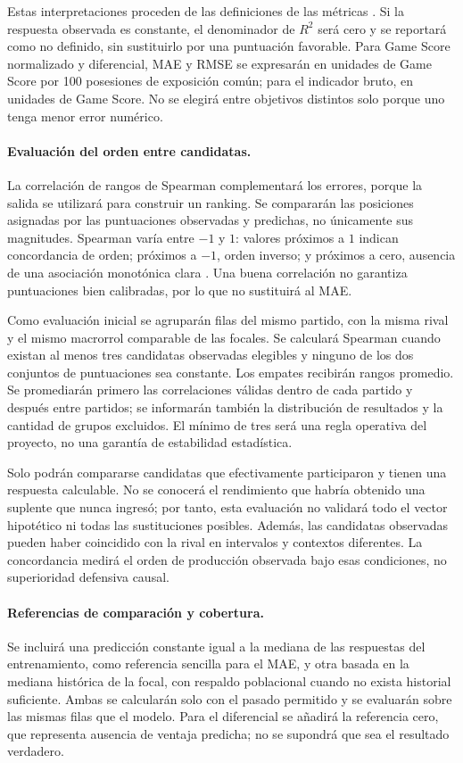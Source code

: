 Estas interpretaciones proceden de las definiciones de las métricas \cite{sklearnMetricas6161}. Si la respuesta observada es constante, el denominador de $R^2$ será cero y se reportará como no definido, sin sustituirlo por una puntuación favorable. Para Game Score normalizado y diferencial, MAE y RMSE se expresarán en unidades de Game Score por 100 posesiones de exposición común; para el indicador bruto, en unidades de Game Score. No se elegirá entre objetivos distintos solo porque uno tenga menor error numérico.

\paragraph*{Evaluación del orden entre candidatas.}
La correlación de rangos de Spearman complementará los errores, porque la salida se utilizará para construir un ranking. Se compararán las posiciones asignadas por las puntuaciones observadas y predichas, no únicamente sus magnitudes. Spearman varía entre $-1$ y $1$: valores próximos a $1$ indican concordancia de orden; próximos a $-1$, orden inverso; y próximos a cero, ausencia de una asociación monotónica clara \cite{scipySpearman6161}. Una buena correlación no garantiza puntuaciones bien calibradas, por lo que no sustituirá al MAE.

Como evaluación inicial se agruparán filas del mismo partido, con la misma rival y el mismo macrorrol comparable de las focales. Se calculará Spearman cuando existan al menos tres candidatas observadas elegibles y ninguno de los dos conjuntos de puntuaciones sea constante. Los empates recibirán rangos promedio. Se promediarán primero las correlaciones válidas dentro de cada partido y después entre partidos; se informarán también la distribución de resultados y la cantidad de grupos excluidos. El mínimo de tres será una regla operativa del proyecto, no una garantía de estabilidad estadística.

Solo podrán compararse candidatas que efectivamente participaron y tienen una respuesta calculable. No se conocerá el rendimiento que habría obtenido una suplente que nunca ingresó; por tanto, esta evaluación no validará todo el vector hipotético ni todas las sustituciones posibles. Además, las candidatas observadas pueden haber coincidido con la rival en intervalos y contextos diferentes. La concordancia medirá el orden de producción observada bajo esas condiciones, no superioridad defensiva causal.

\paragraph*{Referencias de comparación y cobertura.}
Se incluirá una predicción constante igual a la mediana de las respuestas del entrenamiento, como referencia sencilla para el MAE, y otra basada en la mediana histórica de la focal, con respaldo poblacional cuando no exista historial suficiente. Ambas se calcularán solo con el pasado permitido y se evaluarán sobre las mismas filas que el modelo. Para el diferencial se añadirá la referencia cero, que representa ausencia de ventaja predicha; no se supondrá que sea el resultado verdadero.

